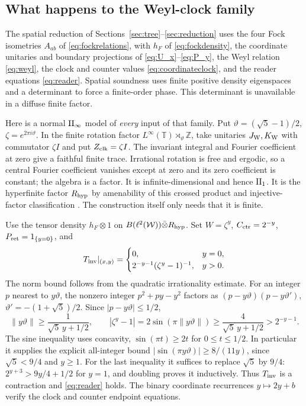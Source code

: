 \subsection{What happens to the Weyl-clock family}\label{sec:weylsemifinite}
The spatial reduction of Sections~\ref{sec:tree}--\ref{sec:reduction} uses the four Fock isometries $A_{ab}$ of \eqref{eq:fockrelations}, with $h_F$ of \eqref{eq:fockdensity}, the coordinate unitaries and boundary projections of \eqref{eq:U_x}--\eqref{eq:P_y}, the Weyl relation \eqref{eq:weyl}, the clock and counter values \eqref{eq:coordinateclock}, and the reader equations \eqref{eq:reader}. Spatial soundness uses finite positive density eigenspaces and a determinant to force a finite-order phase. This determinant is unavailable in a diffuse finite factor.

Here is a normal $\mathrm{II}_\infty$ model of \emph{every} input of that family. Put $\vartheta=(\sqrt5-1)/2$, $\zeta=e^{2\pi i\vartheta}$. In the finite rotation factor $L^\infty(\mathbb T)\rtimes_\vartheta\mathbb Z$, take unitaries $J_{\rm W},K_{\rm W}$ with commutator $\zeta I$ and put $Z_{\rm clk}=\zeta I$. The invariant integral and Fourier coefficient at zero give a faithful finite trace. Irrational rotation is free and ergodic, so a central Fourier coefficient vanishes except at zero and its zero coefficient is constant; the algebra is a factor. It is infinite-dimensional and hence $\mathrm{II}_1$. It is the hyperfinite factor $R_{\rm hyp}$ by amenability of this crossed product and injective-factor classification \cite{Connes76}. The construction itself only needs that it is finite.

Use the tensor density $h_F\otimes1$ on $B(\ell^2(\mathcal W))\bar\otimes R_{\rm hyp}$. Set $W=\zeta^y$, $C_{\rm ctr}=2^{-y}$, $P_{\rm ret}=1_{\{y=0\}}$, and
\[
 T_{\rm inv}|_{(x,y)}=
 \begin{cases}0,&y=0,\\
 2^{-y-1}(\zeta^y-1)^{-1},&y>0.
 \end{cases}
\]
The norm bound follows from the quadratic irrationality estimate. For an integer $p$ nearest to $y\vartheta$, the nonzero integer $p^2+py-y^2$ factors as $(p-y\vartheta)(p-y\vartheta')$, $\vartheta'=-(1+\sqrt5)/2$. Since $|p-y\vartheta|\leq1/2$,
\[
 \|y\vartheta\|\geq\frac1{\sqrt5\,y+1/2},\qquad
 |\zeta^y-1|=2\sin(\pi\|y\vartheta\|)
 \geq\frac4{\sqrt5\,y+1/2}>2^{-y-1}.
\]
The sine inequality uses concavity, $\sin(\pi t)\geq2t$ for $0\leq t\leq1/2$. In particular it supplies the explicit all-integer bound $|\sin(\pi y\vartheta)|\geq8/(11y)$, since $\sqrt5<9/4$ and $y\geq1$. For the last inequality it suffices to replace $\sqrt5$ by $9/4$: $2^{y+3}>9y/4+1/2$ for $y=1$, and doubling proves it inductively. Thus $T_{\rm inv}$ is a contraction and \eqref{eq:reader} holds. The binary coordinate recurrences $y\mapsto2y+b$ verify the clock and counter endpoint equations.

